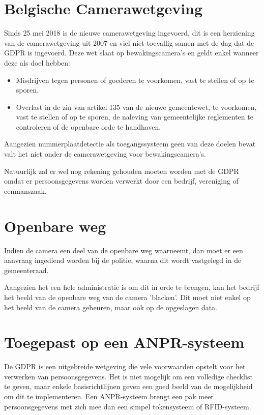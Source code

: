 \section{Belgische Camerawetgeving}
Sinds 25 mei 2018 is de nieuwe camerawetgeving ingevoerd, dit is een herziening van de camerawetgeving uit 2007 en viel niet toevallig samen met de dag dat de GDPR is ingevoerd. Deze wet slaat op bewakingscamera's en geldt enkel wanneer deze als doel hebben:
\begin{itemize}
	\item Misdrijven tegen personen of goederen te voorkomen, vast te stellen of op te sporen.
	\item Overlast in de zin van artikel 135 van de nieuwe gemeentewet, te voorkomen, vast te stellen of op te sporen, de naleving van gemeentelijke reglementen te controleren of de openbare orde te handhaven.
\end{itemize}
Aangezien nummerplaatdetectie als toegangssysteem geen van deze doelen bevat valt het niet onder de camerawetgeving voor bewakingscamera's. \autocite{staatsblad2007wet}

Natuurlijk zal er wel nog rekening gehouden moeten worden met de GDPR omdat er persoonsgegevens worden verwerkt door een bedrijf, vereniging of eenmanszaak. \autocite{gba2019videoparlofoon}

\section{Openbare weg}
Indien de camera een deel van de openbare weg waarneemt, dan moet er een aanvraag ingediend worden bij de politie, waarna dit wordt vastgelegd in de gemeenteraad. \autocite{beltug2018camerawet}

Aangezien het een hele administratie is om dit in orde te brengen, kan het bedrijf het beeld van de openbare weg van de camera 'blacken'. Dit moet niet enkel op het beeld van de camera gebeuren, maar ook op de opgeslagen data. \autocite{beltug2018camerawet}

\section{Toegepast op een ANPR-systeem}
De GDPR is een uitgebreide wetgeving die vele voorwaarden opstelt voor het verwerken van persoonsgegevens. Het is niet mogelijk om een volledige checklist te geven, maar enkele basisrichtlijnen geven een goed beeld van de mogelijkheid om dit te implementeren. Een ANPR-systeem brengt een pak meer persoonsgegevens met zich mee dan een simpel tokensysteem of RFID-systeem.

